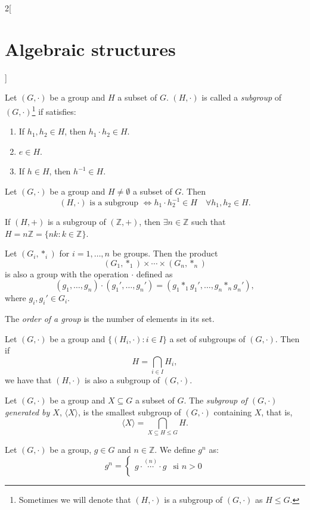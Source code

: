 \documentclass[class=article,10pt,crop=false]{standalone}
\begin{document}
\begin{multicols}{2}[\section{Algebraic structures}]
\begin{definition}[Subgroup]
Let $(G,\cdot)$ be a group and $H$ a subset of $G$. $(H,\cdot)$ is called a \textit{subgroup} of $(G,\cdot)$\footnote{Sometimes we will denote that $(H,\cdot)$ is a subgroup of $(G,\cdot)$ as $H\leq G$.} if satisfies:
\begin{enumerate}
    \item If $h_1,h_2\in H$, then $h_1\cdot h_2\in H$.
    \item $e\in H$.
    \item If $h\in H$, then $h^{-1}\in H$.
\end{enumerate}
\end{definition}
\begin{prop}
Let $(G,\cdot)$ be a group and $H\ne\emptyset$ a subset of $G$. Then $$(H,\cdot)\text{ is a subgroup }\iff h_1\cdot h_2^{-1}\in H\quad\forall h_1,h_2\in H.$$
\end{prop}
\begin{prop}
If $(H,+)$ is a subgroup of $(\mathbb{Z},+)$, then $\exists n\in\mathbb{Z}$ such that $H=n\mathbb{Z}=\{nk:k\in\mathbb{Z}\}$.
\end{prop}
\begin{prop}
Let $(G_i,*_i)$ for $i=1,\ldots, n$ be groups. Then the product $$(G_1,*_1)\times\cdots\times(G_n,*_n)$$ is also a group with the operation $\cdot$ defined as $$(g_1,\ldots,g_n)\cdot(g_1',\ldots,g_n')=(g_1*_1g_1',\ldots,g_n*_ng_n'),$$ where $g_i,g_i'\in G_i$.
\end{prop}
\begin{definition}
The \textit{order of a group} is the number of elements in its set.
\end{definition}
\begin{lemma}
Let $(G,\cdot)$ be a group and $\{(H_i,\cdot):i\in I\}$ a set of subgroups of $(G,\cdot)$. Then if $$H=\displaystyle\bigcap_{i\in I}H_i,$$ we have that $(H,\cdot)$ is also a subgroup of $(G,\cdot)$.
\end{lemma}
\begin{definition}
Let $(G,\cdot)$ be a group and $X\subseteq G$ a subset of $G$. The \textit{subgroup of $(G,\cdot)$ generated by $X$}, $\langle X\rangle$, is the smallest subgroup of $(G,\cdot)$ containing $X$, that is, $$\langle X\rangle=\bigcap_{X\subseteq H\leq G}H.$$
\end{definition}
\begin{definition}
Let $(G,\cdot)$ be a group, $g\in G$ and $n\in\mathbb{Z}$. We define $g^n$ as: $$g^n=\left\{\begin{array}{ll}
    g\cdot\overset{(n)}{\cdots}\cdot g & \text{si }n>0  \\

\end{array}$$
\end{definition}
\end{multicols}
\end{document}
